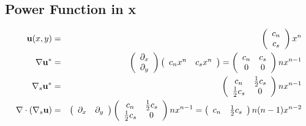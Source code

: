 \documentclass[11pt]{report}
\begin{document}
\subsection{Power Function in x\label{power_x}}
\begin{eqnarray}
{\bf u}(x,y) &=& \left( \begin{array}{c} c_n \\ c_s \end{array}   \right)x^{n} \\
\nabla{\bf u}^* &=& \left( \begin{array}{c} \partial_x \\ \partial_y \end{array}   \right) \left( \begin{array}{cc} c_nx^{n} & c_sx^{n} \end{array}   \right)
 =  \left( \begin{array}{cc} c_n & c_s \\ 0 & 0 \end{array}   \right) nx^{n-1}\\
\nabla_s{\bf u}^* &=&  \left( \begin{array}{cc} c_n & \frac{1}{2}c_s \\ \frac{1}{2}c_s & 0 \end{array}   \right) nx^{n-1}\\
\nabla\cdot\left(\nabla_s{\bf u}\right) &=&  \left( \begin{array}{cc} \partial_x & \partial_y \end{array}   \right)
\left( \begin{array}{cc} c_n & \frac{1}{2}c_s \\ \frac{1}{2}c_s & 0 \end{array}   \right) nx^{n-1}
 = \left( \begin{array}{cc} c_n & \frac{1}{2}c_s \end{array}   \right) n(n-1)x^{n-2}
\end{eqnarray}
\end{document}
